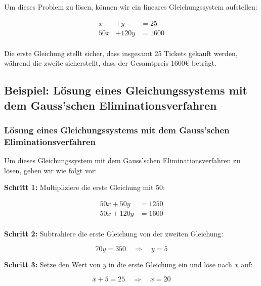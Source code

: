 \documentclass{beamer}
\begin{document}
\begin{frame} 
  
  Um dieses Problem zu lösen, können wir ein lineares Gleichungssystem aufstellen:
  
    \begin{align*}
    x &+ y &= 25 \\
    50x &+ 120y &= 1600 \\
  \end{align*}
  
  
  Die erste Gleichung stellt sicher, dass insgesamt 25 Tickets gekauft werden, während die zweite sicherstellt, dass der Gesamtpreis 1600€ beträgt.
\end{frame}


\subsection{Beispiel: Lösung eines Gleichungssystems mit dem Gauss'schen Eliminationsverfahren}
\begin{frame}
  \frametitle{Lösung eines Gleichungssystems mit dem Gauss'schen Eliminationsverfahren}
  Um dieses Gleichungssystem mit dem Gauss'schen Eliminationsverfahren zu lösen, gehen wir wie folgt vor:
  
  \vspace{0.3cm}
  
  \textbf{Schritt 1:} Multipliziere die erste Gleichung mit 50:
  
  \[
  \begin{aligned}
    50x + 50y &= 1250 \\
    50x + 120y &= 1600 \\
  \end{aligned}
  \]
  
  \textbf{Schritt 2:} Subtrahiere die erste Gleichung von der zweiten Gleichung:
  
  \[
  70y = 350 \quad \Rightarrow \quad y = 5
  \]
  
  \textbf{Schritt 3:} Setze den Wert von $y$ in die erste Gleichung ein und löse nach $x$ auf:
  
  \[
  x + 5 = 25 \quad \Rightarrow \quad x = 20
  \]
\end{frame}
\end{document}
